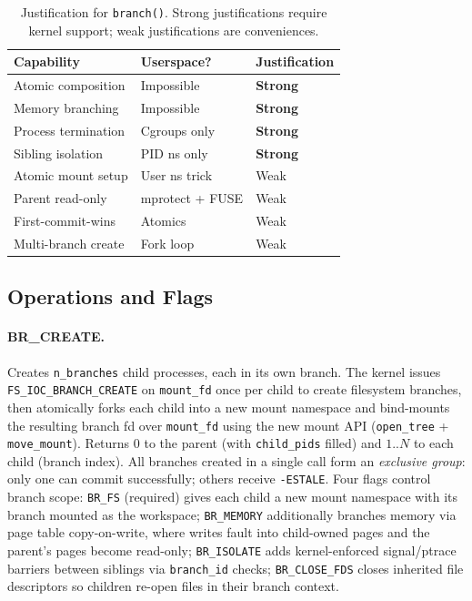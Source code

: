\documentclass[sigconf]{acmart}
\newcommand{\syscall}{\texttt{branch()}\xspace}
\begin{document}
\begin{table}[t]
	\centering
	\caption{Justification for \syscall. Strong justifications require kernel support; weak justifications are conveniences.}
	\label{tab:justification}
	\begin{tabular}{lll}
		\toprule
		Capability            & Userspace?      & Justification   \\
		\midrule
		Atomic composition    & Impossible      & \textbf{Strong} \\
		Memory branching      & Impossible      & \textbf{Strong} \\
		Process termination   & Cgroups only    & \textbf{Strong} \\
		Sibling isolation     & PID ns only     & \textbf{Strong} \\
		Atomic mount setup    & User ns trick   & Weak            \\
		Parent read-only      & mprotect + FUSE & Weak            \\
		First-commit-wins     & Atomics         & Weak            \\
		Multi-branch create   & Fork loop       & Weak            \\
		\bottomrule
	\end{tabular}
\end{table}

\subsection{Operations and Flags}

\paragraph{BR\_CREATE.}
Creates \texttt{n\_branches} child processes, each in its own branch. The kernel issues \texttt{FS\_IOC\_BRANCH\_CREATE} on \texttt{mount\_fd} once per child to create filesystem branches, then atomically forks each child into a new mount namespace and bind-mounts the resulting branch fd over \texttt{mount\_fd} using the new mount API (\texttt{open\_tree} + \texttt{move\_mount}). Returns 0 to the parent (with \texttt{child\_pids} filled) and $1..N$ to each child (branch index). All branches created in a single call form an \emph{exclusive group}: only one can commit successfully; others receive \texttt{-ESTALE}. Four flags control branch scope: \texttt{BR\_FS} (required) gives each child a new mount namespace with its branch mounted as the workspace; \texttt{BR\_MEMORY} additionally branches memory via page table copy-on-write, where writes fault into child-owned pages and the parent's pages become read-only; \texttt{BR\_ISOLATE} adds kernel-enforced signal/ptrace barriers between siblings via \texttt{branch\_id} checks; \texttt{BR\_CLOSE\_FDS} closes inherited file descriptors so children re-open files in their branch context.
\end{document}
